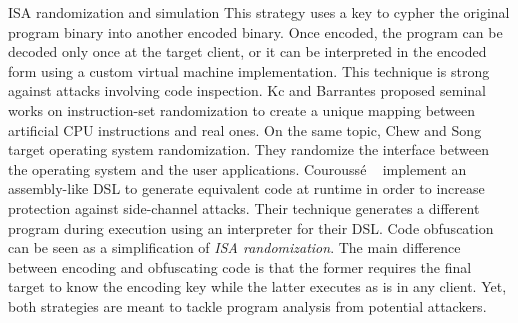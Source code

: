 \begin{strategy}{ISA randomization and simulation}
    \label{strategy:S5}
    \normalfont
    This strategy uses a key to cypher the original program binary into another encoded binary. 
    Once encoded, the program can be decoded only once at the target client, or it can be interpreted in the encoded form using a custom virtual machine implementation. This technique is strong against attacks involving code inspection. 
    Kc \etal \cite{Kc03} and Barrantes \etal \cite{barrantes2003randomized} proposed seminal works on instruction-set randomization 
    to create a unique mapping between artificial CPU instructions and real ones.
    On the same topic, Chew and Song \cite{Chew02mitigatingbuffer} target operating system randomization. They randomize the interface between the operating system and the user applications.
    Courouss{\'e} \etal~\cite{courousse2016runtime} implement an assembly-like DSL to generate equivalent code at runtime in order to increase protection against side-channel attacks. Their technique generates a different program during execution using an interpreter for their DSL.
    Code obfuscation \cite{wobfuscator} can be seen as a simplification of \emph{ISA randomization}. The main difference between encoding and obfuscating code is that the former requires the final target to know the encoding key while the latter executes as is in any client. Yet, both strategies are meant to tackle program analysis from potential attackers. 

    
\end{strategy}

 


